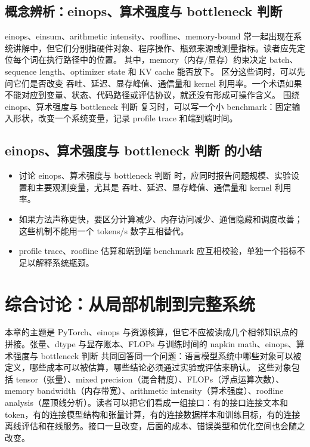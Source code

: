 \documentclass[a4paper]{article}
\begin{document}
\subsection{概念辨析：einops、算术强度与 bottleneck 判断}
einops、einsum、arithmetic intensity、roofline、memory-bound 常一起出现在系统讲解中，但它们分别指硬件对象、程序操作、瓶颈来源或测量指标。读者应先定位每个词在执行路径中的位置。
其中，memory（内存/显存）约束决定 batch、sequence length、optimizer state 和 KV cache 能否放下。
区分这些词时，可以先问它们是否改变 吞吐、延迟、显存峰值、通信量和 kernel 利用率。一个术语如果不能对应到变量、状态、代码路径或评估协议，就还没有形成可操作含义。
围绕 einops、算术强度与 bottleneck 判断 复习时，可以写一个小 benchmark：固定输入形状，改变一个系统变量，记录 profile trace 和端到端时间。
\subsection{einops、算术强度与 bottleneck 判断 的小结}
\begin{itemize}
\item 讨论 einops、算术强度与 bottleneck 判断 时，应同时报告问题规模、实验设置和主要观测变量，尤其是 吞吐、延迟、显存峰值、通信量和 kernel 利用率。
\item 如果方法声称更快，要区分计算减少、内存访问减少、通信隐藏和调度改善；这些机制不能用一个 tokens/s 数字互相替代。
\item profile trace、roofline 估算和端到端 benchmark 应互相校验，单独一个指标不足以解释系统瓶颈。
\end{itemize}
\section{综合讨论：从局部机制到完整系统}
本章的主题是 PyTorch、einops 与资源核算，但它不应被读成几个相邻知识点的拼接。张量、dtype 与显存账本、FLOPs 与训练时间的 napkin math、einops、算术强度与 bottleneck 判断 共同回答同一个问题：语言模型系统中哪些对象可以被定义，哪些成本可以被估算，哪些结论必须通过实验或评估来确认。
这些对象包括 tensor（张量）、mixed precision（混合精度）、FLOPs（浮点运算次数）、memory bandwidth（内存带宽）、arithmetic intensity（算术强度）、roofline analysis（屋顶线分析）。读者可以把它们看成一组接口：有的接口连接文本和 token，有的连接模型结构和张量计算，有的连接数据样本和训练目标，有的连接离线评估和在线服务。接口一旦改变，后面的成本、错误类型和优化空间也会随之改变。
\end{document}
